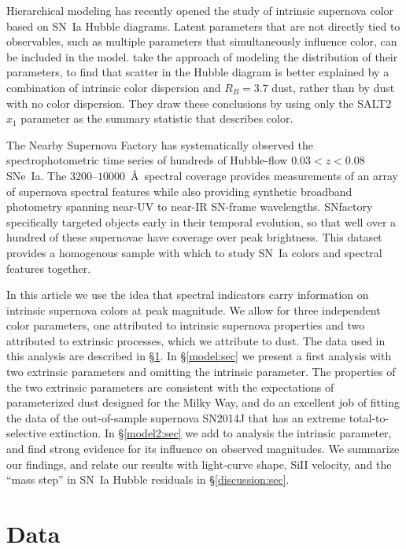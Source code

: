 \documentclass{aastex61}   	%
\begin{document}
Hierarchical modeling has recently opened
the study of intrinsic supernova color based on SN~Ia Hubble diagrams. Latent parameters that are not directly tied to observables,
such as multiple parameters that simultaneously influence color, can be included in the model.
\citet{2016arXiv160904470M} take the approach of modeling the distribution of their parameters, to find that
scatter in the Hubble diagram is better explained by a combination of intrinsic color dispersion and
$R_B=3.7$ dust, rather than by dust with no color dispersion.
They draw these conclusions by using only the SALT2 $x_1$ parameter as the summary statistic that describes color.

The Nearby Supernova Factory \citep[SNfactory;][]{2002SPIE.4836...61A} has systematically observed the
spectrophotometric time series of hundreds of Hubble-flow $0.03<z<0.08$ SNe~Ia.   The $3200$--$10000$~\AA\ spectral coverage
provides measurements of an array of supernova spectral features while also providing synthetic broadband photometry
spanning near-UV to near-IR SN-frame wavelengths.  SNfactory specifically targeted objects
early in their temporal evolution, so that well over a hundred of these supernovae have  coverage over
peak brightness.  This dataset provides a homogenous sample with which to study SN~Ia colors and spectral features together.

In this article we use the idea that spectral indicators carry information on intrinsic supernova colors at peak magnitude.
We allow for three independent color parameters, one attributed to intrinsic supernova
properties and two  attributed to
extrinsic processes, which we attribute to dust.  The data used in this analysis are described in \S\ref{data:sec}.
In \S\ref{model:sec} we present a
first analysis with two extrinsic parameters and omitting the intrinsic parameter.  The properties of the two extrinsic parameters
are consistent with the expectations of parameterized dust designed for the Milky Way, and do an excellent job of fitting the data of the out-of-sample
supernova SN2014J that has an extreme total-to-selective extinction.
In \S\ref{model2:sec} we add to analysis the intrinsic parameter, and find strong evidence for its influence on observed magnitudes.
We summarize our findings, and relate our results with light-curve shape, SiII velocity, and the ``mass step'' in SN~Ia Hubble
residuals in \S\ref{discussion:sec}.


\section{Data}
\label{data:sec}
\end{document}
